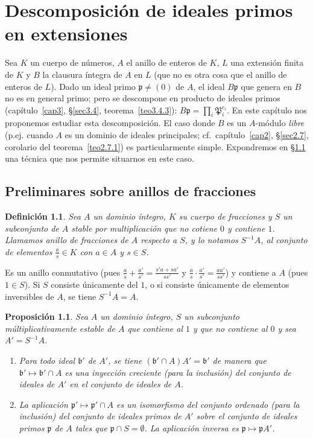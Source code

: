 \documentclass[bibtotoc,leqno,spanish]{amsbook}
\newcommand{\idl}[1]{\mathfrak{#1}}
\numberwithin{equation}{section}
\theoremstyle{note}
\newtheorem{definition}{Definici\'on}
\theoremstyle{note}
\newtheorem{proposition}{Proposici\'on}
\theoremstyle{rem}
\numberwithin{theorem}{section}
\numberwithin{proposition}{section}
\numberwithin{definition}{section}
\numberwithin{lemma}{section}
\numberwithin{corollary}{section}
\numberwithin{example}{section}
\numberwithin{footnote}{section}%
\begin{document}
\chapter{Descomposici\'on de ideales primos en extensiones}\label{cap5}

Sea $K$ un cuerpo de n\'umeros, $A$ el anillo de enteros de $K$, $L$ una extensi\'on finita de $K$ y $B$
la clausura \'integra de $A$ en $L$ (que no es otra cosa que el anillo de enteros de $L$). Dado un ideal primo
$\idl{p}\neq(0)$ de $A$, el ideal $B\idl{p}$ que genera en $B$ no es en general primo; pero se descompone en
producto de ideales primos (cap\'itulo~\ref{cap3}, \S\ref{sec3.4}, teorema~\ref{teo3.4.3}): $B\idl{p}=\prod_{i}\idl{P}_{i}^{e_{i}}$. En este
cap\'itulo nos proponemos estudiar esta descomposici\'on. El caso donde $B$ es un $A$-m\'odulo {\em libre}
(p.ej. cuando $A$ es un dominio de ideales principales;
cf.~cap\'itulo~\ref{cap2}, \S\ref{sec2.7}, corolario del teorema~\ref{teo2.7.1}) es particularmente
simple. Expondremos en \S\ref{sec5.1} una t\'ecnica que nos permite situarnos en este caso.

\section{Preliminares sobre anillos de fracciones}\label{sec5.1}

\begin{definition}
Sea $A$ un dominio \'integro, $K$ su cuerpo de fracciones y $S$ un subconjunto de $A$ stable por multiplicaci\'on
que no cotiene $0$ y contiene $1$. Llamamos anillo de fracciones de $A$ respecto a $S$, y lo notamos $S^{-1}A$,
al conjunto de elementos $\frac{a}{s}\in K$ con $a\in A$ y $s\in S$.
\end{definition}

Es un anillo conmutativo (pues $\frac{a}{s}+\frac{a'}{s'} = \frac{s'a+sa'}{ss'}$ y $\frac{a}{s}\cdot\frac{a'}{s'}=
\frac{aa'}{ss'}$) y contiene a $A$ (pues $1\in S$). Si $S$ consiste \'unicamente del $1$, o si consiste \'unicamente
de elementos inversibles de $A$, se tiene $S^{-1}A=A$.

\begin{proposition}\label{prop5.1.1}
Sea $A$ un dominio \'integro, $S$ un subconjunto m\'ultiplicativamente estable de $A$ que contiene al $1$ y
que no contiene al $0$ y sea $A' = S^{-1}A$.
\begin{enumerate}
\item[1.]
Para todo ideal $\idl{b}'$ de $A'$, se tiene $(\idl{b}'\cap A)A' = \idl{b}'$ de manera que
$\idl{b}'\mapsto\idl{b}'\cap A$ es una inyecci\'on creciente (para la inclusi\'on) del conjunto de ideales de $A'$
en el conjunto de ideales de $A$.
\item[2.]
La aplicaci\'on $\idl{p}'\mapsto\idl{p}'\cap A$ es un isomorfismo del conjunto ordenado (para la inclusi\'on)
del conjunto de ideales primos de $A'$ sobre el conjunto de ideales primos $\idl{p}$ de $A$ tales que
$\idl{p}\cap S=\emptyset$. La aplicaci\'on inversa es $\idl{p}\mapsto\idl{p}A'$.
\end{enumerate}
\end{proposition}
\end{document}
